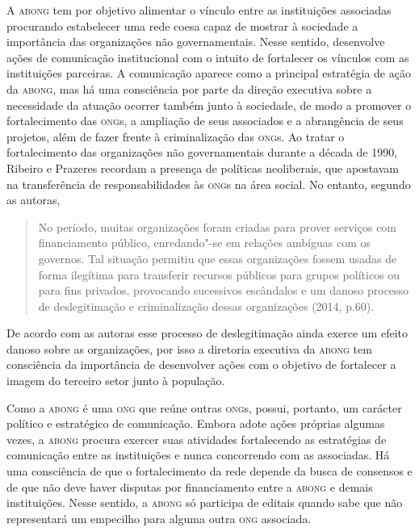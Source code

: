 A \textsc{abong} tem por objetivo alimentar o vínculo entre as instituições
associadas procurando estabelecer uma rede coesa capaz de mostrar à
sociedade a importância das organizações não governamentais. Nesse
sentido, desenvolve ações de comunicação institucional com o intuito de
fortalecer os vínculos com as instituições parceiras. A comunicação
aparece como a principal estratégia de ação da \textsc{abong}, mas há uma
consciência por parte da direção executiva sobre a necessidade da
atuação ocorrer também junto à sociedade, de modo a promover o
fortalecimento das \textsc{ong}s, a ampliação de seus associados e a abrangência
de seus projetos, além de fazer frente à criminalização das \textsc{ong}s. Ao
tratar o fortalecimento das organizações não governamentais durante a
década de 1990, Ribeiro e Prazeres recordam a presença de políticas
neoliberais, que apostavam na transferência de responsabilidades às \textsc{ong}s
na área social. No entanto, segundo as autoras,

\begin{quote}
No período, muitas organizações foram criadas para prover serviços com
financiamento público, enredando"-se em relações ambíguas com os
governos. Tal situação permitiu que essas organizações fossem usadas de
forma ilegítima para transferir recursos públicos para grupos políticos
ou para fins privados, provocando sucessivos escândalos e um danoso
processo de deslegitimação e criminalização dessas organizações (2014,
p.60).
\end{quote}

De acordo com as autoras esse processo de deslegitimação ainda exerce um
efeito danoso sobre as organizações, por isso a diretoria executiva da
\textsc{abong} tem consciência da importância de desenvolver ações com o objetivo
de fortalecer a imagem do terceiro setor junto à população.

Como a \textsc{abong} é uma \textsc{ong} que reúne outras \textsc{ong}s, possui, portanto, um
carácter político e estratégico de comunicação. Embora adote ações
próprias algumas vezes, a \textsc{abong} procura exercer suas atividades
fortalecendo as estratégias de comunicação entre as instituições e nunca
concorrendo com as associadas. Há uma consciência de que o
fortalecimento da rede depende da busca de consensos e de que não deve
haver disputas por financiamento entre a \textsc{abong} e demais instituições.
Nesse sentido, a \textsc{abong} só participa de editais quando sabe que não
representará um empecilho para alguma outra \textsc{ong} associada.

